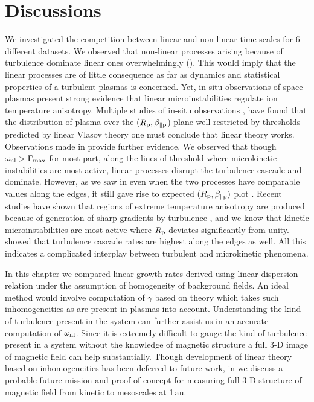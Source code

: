     \section{Discussions} \label{sec:conc7}

        We investigated the competition between linear and non-linear time scales for 6 different
        datasets. We observed that non-linear processes arising because of turbulence dominate
        linear ones overwhelmingly (). This would imply
        that the linear processes are of little consequence as far as dynamics and statistical
        properties of a turbulent plasmas is concerned. Yet, in-situ observations of space plasmas
        present strong evidence that linear microinstabilities regulate ion temperature anisotropy.
        Multiple studies of in-situ observations
        \citep{Gary1991,Gary1994,Gary2001,Gary2006,Kasper2002,Hellinger2006,Maruca2011,Maruca2012,Maruca2018},
        have found that the distribution of plasma over the ($R_{\rm p}, \beta_{\parallel \rm p}$)
        plane well restricted by thresholds predicted by linear Vlasov theory one must conclude that
        linear theory works. Observations made in 
        provide further evidence. We observed that though $\omega_{\rm nl} > \Gamma_{\max}$ for most
        part, along the lines of threshold where microkinetic instabilities are most active, linear
        processes disrupt the turbulence cascade and dominate. However, as we saw in
         even when the two processes have comparable values along the edges,
        it still gave rise to expected $(R_{\rm p}, \beta_{\parallel \rm p})$ plot
        \citep{Maruca2018}. Recent studies have shown that regions of extreme temperature anisotropy
        are produced because of generation of sharp gradients by turbulence
        \citep{Osman2011,Greco2012,Valentini2014,Parashar2016}, and we know that kinetic
        microinstabilities are most active where $R_{\rm p}$ deviates significantly from unity.
        \citet{Osman2013} showed that turbulence cascade rates are highest along the edges as well.
        All this indicates a complicated interplay between turbulent and microkinetic phenomena.

        In this chapter we compared linear growth rates derived using linear dispersion relation
        under the assumption of homogeneity of background fields. An ideal method would involve
        computation of $\gamma$ based on theory which takes such inhomogeneities as are present in
        plasmas into account. Understanding the kind of turbulence present in the system can further
        assist us in an accurate computation of $\omega_{\rm nl}$. Since it is extremely difficult
        to gauge the kind of turbulence present in a system without the knowledge of magnetic
        structure a full 3-D image of magnetic field can help substantially. Though development of
        linear theory based on inhomogeneities has been deferred to future work, in
         we discuss a probable future mission and proof of concept for measuring
        full 3-D structure of magnetic field from kinetic to mesoscales at 1\,au.